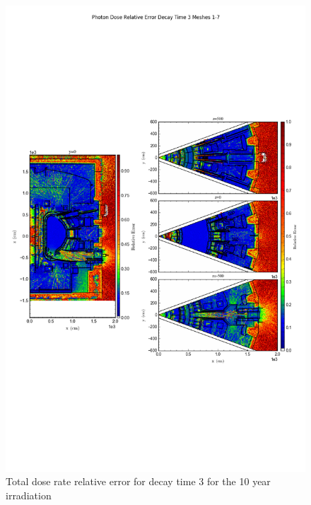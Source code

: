 \documentclass[12pt]{article}
\begin{document}
\begin{figure}[ht!]
\centering
\includegraphics[trim={0cm 8cm, 0cm 8cm},clip,scale=0.75]{../plots/final_model_with_b4c/10year/Photon_Dose_Relative_Error_Decay_Time_3_Meshes_1-7.png}
\caption{Total dose rate relative error for decay time 3 for the 10 year irradiation}
\label{fig:photons_10y_dc3_b4c_relerr}
\end{figure}
\newpage
\end{document}
